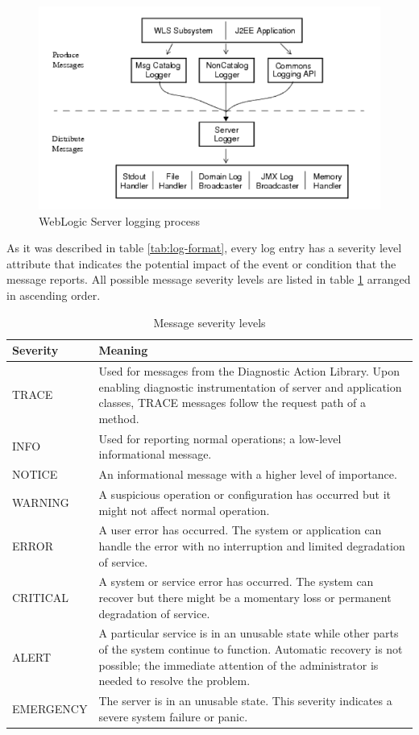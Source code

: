 \documentclass[thesis=M,english]{FITthesis}[2019/12/23]
\begin{document}
\begin{figure}\centering
	\includegraphics[scale=0.8]{wls-logging}
	\caption{WebLogic Server logging process}\label{fig:wls-logging}
\end{figure}

As it was described in table \ref{tab:log-format}, every log entry has a severity level attribute that indicates the potential impact of the event or condition that the message reports. All possible message severity levels are listed in table \ref{tab:wls-log-severity} arranged in ascending order.

\begin{table}\centering
	\caption{Message severity levels}\label{tab:wls-log-severity}
	\begin{tabular}{ |m{7em}|m{9cm}| }
		\hline
		\textbf{Severity} & \textbf{Meaning}\\
		\hline
		 TRACE & Used for messages from the Diagnostic Action Library. Upon enabling diagnostic instrumentation of server and application classes, TRACE messages follow the request path of a method. \\
		\hline
		 INFO & Used for reporting normal operations; a low-level informational message. \\
		\hline
		 NOTICE & An informational message with a higher level of importance. \\
		\hline
		 WARNING & A suspicious operation or configuration has occurred but it might not affect normal operation. \\
		\hline
		 ERROR & A user error has occurred. The system or application can handle the error with no interruption and limited degradation of service.\\
		\hline
		 CRITICAL & A system or service error has occurred. The system can recover but there might be a momentary loss or permanent degradation of service.\\
		\hline
		 ALERT & A particular service is in an unusable state while other parts of the system continue to function. Automatic recovery is not possible; the immediate attention of the administrator is needed to resolve the problem. \\
		\hline
		 EMERGENCY & The server is in an unusable state. This severity indicates a severe system failure or panic\cite{weblogic-log-structure}.\\
		\hline
	\end{tabular}
\end{table}
\end{document}
